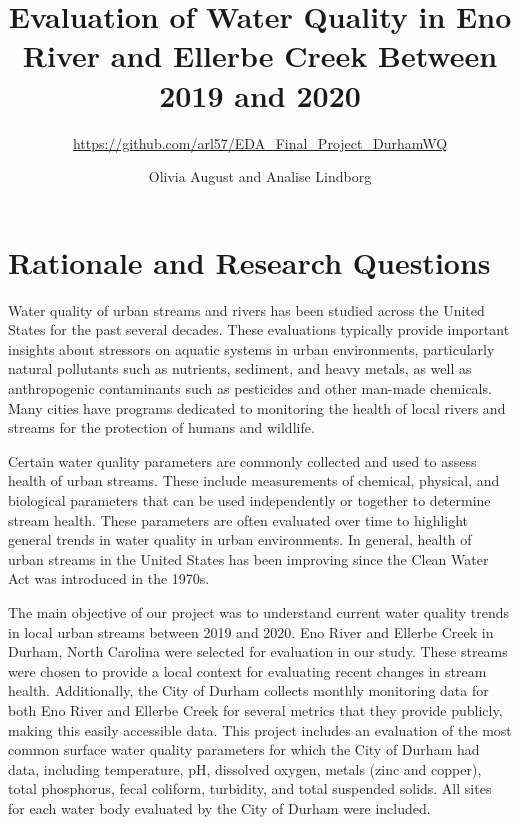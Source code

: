 \documentclass[
  12pt,
]{article}
\title{Evaluation of Water Quality in Eno River and Ellerbe Creek
Between 2019 and 2020}
\subtitle{\url{https://github.com/arl57/EDA_Final_Project_DurhamWQ}}
\author{Olivia August and Analise Lindborg}
\date{}
\begin{document}
\maketitle

\newpage
\tableofcontents 
\newpage
\listoftables 
\newpage
\listoffigures 
\newpage

\hypertarget{rationale-and-research-questions}{%
\section{Rationale and Research
Questions}\label{rationale-and-research-questions}}

Water quality of urban streams and rivers has been studied across the
United States for the past several decades. These evaluations typically
provide important insights about stressors on aquatic systems in urban
environments, particularly natural pollutants such as nutrients,
sediment, and heavy metals, as well as anthropogenic contaminants such
as pesticides and other man-made chemicals. Many cities have programs
dedicated to monitoring the health of local rivers and streams for the
protection of humans and wildlife.

Certain water quality parameters are commonly collected and used to
assess health of urban streams. These include measurements of chemical,
physical, and biological parameters that can be used independently or
together to determine stream health. These parameters are often
evaluated over time to highlight general trends in water quality in
urban environments. In general, health of urban streams in the United
States has been improving since the Clean Water Act was introduced in
the 1970s.

The main objective of our project was to understand current water
quality trends in local urban streams between 2019 and 2020. Eno River
and Ellerbe Creek in Durham, North Carolina were selected for evaluation
in our study. These streams were chosen to provide a local context for
evaluating recent changes in stream health. Additionally, the City of
Durham collects monthly monitoring data for both Eno River and Ellerbe
Creek for several metrics that they provide publicly, making this easily
accessible data. This project includes an evaluation of the most common
surface water quality parameters for which the City of Durham had data,
including temperature, pH, dissolved oxygen, metals (zinc and copper),
total phosphorus, fecal coliform, turbidity, and total suspended solids.
All sites for each water body evaluated by the City of Durham were
included.
\end{document}
